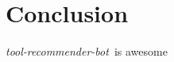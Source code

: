 \documentclass[sigconf,review,anonymous]{acmart}
\newcommand{\tool}{\textsl{tool-recommender-bot}}
\begin{document}
\section{Conclusion}

\tool~is awesome




  
%

\end{document}
